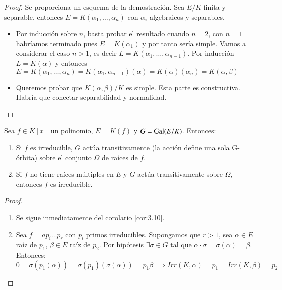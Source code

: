 \begin{proof}
    Se proporciona un esquema de la demostración. Sea $E/K$ finita y separable, entonces $E = K(\alpha_1, \ldots, \alpha_n)$ con $\alpha_i$ algebraicos y separables.
    \begin{itemize}
        \item Por inducción sobre $n$, basta probar el resultado cuando $n =2$, con $n = 1$ habríamos terminado pues $E = K(\alpha_1)$ y por tanto sería simple. Vamos a considerar el caso $n > 1$, es decir $L = K(\alpha_1, \ldots, \alpha_{n-1})$. Por inducción $L = K(\alpha)$ y entonces $E = K(\alpha_1, \ldots, \alpha_n) = K(\alpha_1, \alpha_{n-1})(\alpha) = K(\alpha)(\alpha_n) = K(\alpha, \beta)$
        \item Queremos probar que $K(\alpha, \beta)/K$ es simple. Esta parte es constructiva. Habría que conectar separabilidad y normalidad.
    \end{itemize}
\end{proof}


\begin{pro} %
    Sea $f \in K[x]$ un polinomio, $E = K(f)$ y $G = \mathrm{Gal}(E/K)$. Entonces:
    \begin{enumerate}
        \item Si $f$ es irreducible, $G$ actúa transitivamente (la acción define una sola G-órbita) sobre el conjunto $\Omega$ de raíces de $f$.
        \item Si $f$ no tiene raíces múltiples en $E$ y $G$ actúa transitivamente sobre $\Omega$, entonces $f$ es irreducible.
    \end{enumerate}
\end{pro}
\begin{proof}$ $
    \begin{enumerate}
        \item Se sigue inmediatamente del corolario \ref{cor:3.10}.
        \item Sea $f = a p_i \ldots p_r$ con $p_i$ primos irreducibles. Supongamos que $r > 1$, sea $\alpha \in E$ raíz de $p_1$, $\beta \in E$ raíz de $p_2$. Por hipótesis $\exists \sigma \in G$ tal que $\alpha \cdot \sigma = \sigma(\alpha) = \beta$. Entonces:
        $$
            0 = \sigma(p_1(\alpha)) = \sigma(p_1)(\sigma(\alpha)) = p_1 \beta \implies Irr(K, \alpha) = p_1 = Irr(K, \beta) = p_2
        $$
    \end{enumerate}
\end{proof}

